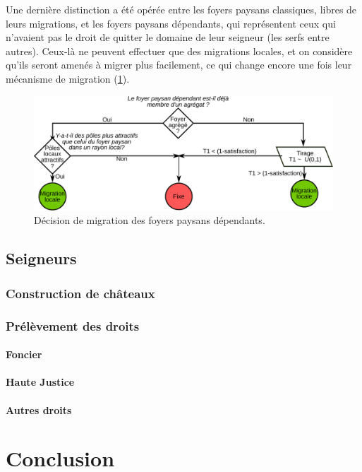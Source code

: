 Une dernière distinction a été opérée entre les foyers paysans classiques, libres de leurs migrations, et les foyers paysans \og dépendants\fg{}, qui représentent ceux qui n'avaient pas le droit de quitter le domaine de leur seigneur (les serfs entre autres). Ceux-là ne peuvent effectuer que des migrations locales, et on considère qu'ils seront amenés à migrer plus facilement, ce qui change encore une fois leur mécanisme de migration (\cref{fig:choix-migration-dependants}).
\begin{figure}[H]
	\centering
	\includegraphics[width=0.9\linewidth]{img/choix_migration_dependants.pdf}
	\caption{Décision de migration des foyers paysans dépendants.}
	\label{fig:choix-migration-dependants}
\end{figure}
 

	
\subsection{Seigneurs}
	\subsubsection{Construction de châteaux \label{sssec:constru-chateaux}}
	\subsubsection{Prélèvement des droits \label{sssec:collecte-droits}}
		\paragraph{Foncier}
		\paragraph{Haute Justice}
		\paragraph{Autres droits}


\section*{Conclusion}

\printbibliography[title={Références}]
